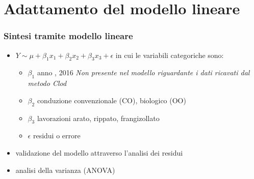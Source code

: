 \section{Adattamento del modello lineare}
\begin{frame}
  \frametitle{Sintesi tramite modello lineare}
  \begin{itemize}
    \item 
    \vspace{0.25cm}
    $Y \sim \mu + \beta_1x_1 + \beta_2x_2 + \beta_3x_3 + \epsilon$
    \vspace{0.25cm}
    in cui le variabili categoriche sono:
    \begin{itemize}
      \item $\beta_1$ anno , 2016 \emph{Non
        presente nel modello riguardante i dati ricavati dal metodo \emph{Clod}}
      \item $\beta_2$ conduzione \newline convenzionale
      (CO), biologico (OO) \item $\beta_3$
      lavorazioni \newline arato, rippato, frangizollato
      \item$\epsilon$ residui o errore
    \end{itemize}
    \item validazione del modello attraverso l'analisi
    dei residui 
    \item analisi della varianza (ANOVA)
  \end{itemize}
\end{frame}

